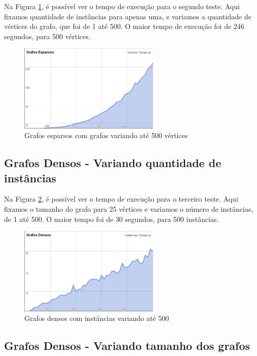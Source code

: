 \documentclass[12pt]{article}
\begin{document}
	Na Figura \ref{esp_graf_var}, é possível ver o tempo de execução para o segundo teste. Aqui fixamos quantidade de instâncias para apenas uma, e variamos a quantidade de vértices do grafo, que foi de 1 até 500. O maior tempo de execução foi de $246$ segundos, para 500 vértices.

\begin{figure}[h!]
	\centering
	\includegraphics[width=0.60\textwidth]{graph_esparso_grafvar.png}
	\caption{Grafos esparsos com grafos variando até 500 vértices}
	\label{esp_graf_var}
\end{figure}

\subsection{Grafos Densos - Variando quantidade de instâncias}
\label{densos_inst}

	Na Figura \ref{den_inst_var}, é possível ver o tempo de execução para o terceiro teste. Aqui fixamos o tamanho do grafo para 25 vértices e variamos o número de instâncias, de 1 até 500. O maior tempo foi de $30$ segundos, para 500 instâncias.

\begin{figure}[h!]
	\centering
	\includegraphics[width=0.60\textwidth]{graph_denso_instvar.png}
	\caption{Grafos densos com instâncias variando até 500}
	\label{den_inst_var}
\end{figure}

\subsection{Grafos Densos - Variando tamanho dos grafos}
\label{densos_graf}
\end{document}
